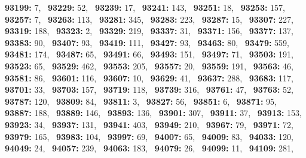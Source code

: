 \textbf{93199:} 7,\allowbreak~ 
\textbf{93229:} 52,\allowbreak~ 
\textbf{93239:} 17,\allowbreak~ 
\textbf{93241:} 143,\allowbreak~ 
\textbf{93251:} 18,\allowbreak~ 
\textbf{93253:} 157,\allowbreak~ 
\textbf{93257:} 7,\allowbreak~ 
\textbf{93263:} 113,\allowbreak~ 
\textbf{93281:} 345,\allowbreak~ 
\textbf{93283:} 223,\allowbreak~ 
\textbf{93287:} 15,\allowbreak~ 
\textbf{93307:} 227,\allowbreak~ 
\textbf{93319:} 188,\allowbreak~ 
\textbf{93323:} 2,\allowbreak~ 
\textbf{93329:} 219,\allowbreak~ 
\textbf{93337:} 31,\allowbreak~ 
\textbf{93371:} 156,\allowbreak~ 
\textbf{93377:} 137,\allowbreak~ 
\textbf{93383:} 90,\allowbreak~ 
\textbf{93407:} 93,\allowbreak~ 
\textbf{93419:} 111,\allowbreak~ 
\textbf{93427:} 93,\allowbreak~ 
\textbf{93463:} 80,\allowbreak~ 
\textbf{93479:} 559,\allowbreak~ 
\textbf{93481:} 174,\allowbreak~ 
\textbf{93487:} 65,\allowbreak~ 
\textbf{93491:} 66,\allowbreak~ 
\textbf{93493:} 151,\allowbreak~ 
\textbf{93497:} 71,\allowbreak~ 
\textbf{93503:} 191,\allowbreak~ 
\textbf{93523:} 65,\allowbreak~ 
\textbf{93529:} 462,\allowbreak~ 
\textbf{93553:} 205,\allowbreak~ 
\textbf{93557:} 20,\allowbreak~ 
\textbf{93559:} 191,\allowbreak~ 
\textbf{93563:} 46,\allowbreak~ 
\textbf{93581:} 86,\allowbreak~ 
\textbf{93601:} 116,\allowbreak~ 
\textbf{93607:} 10,\allowbreak~ 
\textbf{93629:} 41,\allowbreak~ 
\textbf{93637:} 288,\allowbreak~ 
\textbf{93683:} 117,\allowbreak~ 
\textbf{93701:} 33,\allowbreak~ 
\textbf{93703:} 157,\allowbreak~ 
\textbf{93719:} 118,\allowbreak~ 
\textbf{93739:} 316,\allowbreak~ 
\textbf{93761:} 47,\allowbreak~ 
\textbf{93763:} 52,\allowbreak~ 
\textbf{93787:} 120,\allowbreak~ 
\textbf{93809:} 84,\allowbreak~ 
\textbf{93811:} 3,\allowbreak~ 
\textbf{93827:} 56,\allowbreak~ 
\textbf{93851:} 6,\allowbreak~ 
\textbf{93871:} 95,\allowbreak~ 
\textbf{93887:} 188,\allowbreak~ 
\textbf{93889:} 146,\allowbreak~ 
\textbf{93893:} 136,\allowbreak~ 
\textbf{93901:} 307,\allowbreak~ 
\textbf{93911:} 37,\allowbreak~ 
\textbf{93913:} 153,\allowbreak~ 
\textbf{93923:} 34,\allowbreak~ 
\textbf{93937:} 131,\allowbreak~ 
\textbf{93941:} 403,\allowbreak~ 
\textbf{93949:} 210,\allowbreak~ 
\textbf{93967:} 79,\allowbreak~ 
\textbf{93971:} 72,\allowbreak~ 
\textbf{93979:} 165,\allowbreak~ 
\textbf{93983:} 104,\allowbreak~ 
\textbf{93997:} 69,\allowbreak~ 
\textbf{94007:} 65,\allowbreak~ 
\textbf{94009:} 83,\allowbreak~ 
\textbf{94033:} 120,\allowbreak~ 
\textbf{94049:} 24,\allowbreak~ 
\textbf{94057:} 239,\allowbreak~ 
\textbf{94063:} 183,\allowbreak~ 
\textbf{94079:} 26,\allowbreak~ 
\textbf{94099:} 11,\allowbreak~ 
\textbf{94109:} 281,\allowbreak~ 
